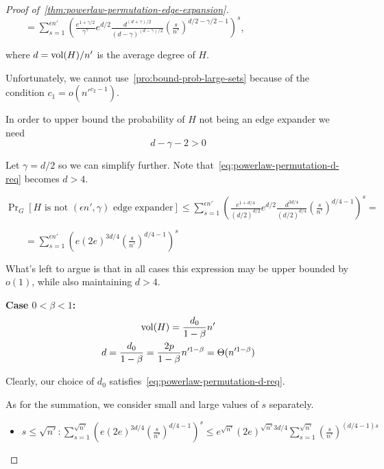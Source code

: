 \begin{proof}[Proof of~\autoref{thm:powerlaw-permutation-edge-expansion}]
    $\qquad=\sum_{s=1}^{\epsilon n'}{\left(
    \frac{e^{1+\gamma/2}}{\gamma^\gamma}
    e^{d/2}
    \frac{d^{(d+\gamma)/2}}{(d-\gamma)^{(d-\gamma)/2}}
    \left(\frac{s}{n'}\right)^{d/2-\gamma/2-1}
    \right)^s}$,
    
    where $d=\operatorname*{vol}(H)/n'$ is the average degree of $H$.
    
    Unfortunately, we cannot use~\autoref{pro:bound-prob-large-sets}
    because of the condition $c_1=o\left(n'^{c_2-1}\right)$.
    
    In order to upper bound the probability of $H$ not being an edge expander we need
    \begin{equation}
        \label{eq:powerlaw-permutation-d-req}
        d-\gamma-2>0
    \end{equation}
    
    Let $\gamma=d/2$ so we can simplify further.
    Note that~\eqref{eq:powerlaw-permutation-d-req} becomes $d>4$.
    
    $\Pr_G[H\text{ is not }(\epsilon n',\gamma)\text{ edge expander}]\leq\sum_{s=1}^{\epsilon n'}{\left(
        \frac{e^{1+d/4}}{(d/2)^{d/2}}
        e^{d/2}
        \frac{d^{3d/4}}{(d/2)^{d/4}}
        \left(\frac{s}{n'}\right)^{d/4-1}
    \right)^s}=$
    
    $\qquad=\sum_{s=1}^{\epsilon n'}{\left(
        e
        (2e)^{3d/4}
        \left(\frac{s}{n'}\right)^{d/4-1}
    \right)^s}$

    What's left to argue is that in all cases this expression may be upper bounded by $o(1)$, while also maintaining $d>4$.
    
    \textbf{Case $0<\beta<1$:}
    \begin{gather*}
        \operatorname*{vol}(H)=\frac{d_0}{1-\beta}n'\\
        d=\frac{d_0}{1-\beta}=\frac{2p}{1-\beta}n'^{1-\beta}=\Theta(n'^{1-\beta})
    \end{gather*}
    
    Clearly, our choice of $d_0$ satisfies~\eqref{eq:powerlaw-permutation-d-req}.

    As for the summation, we consider small and large values of $s$ separately.
    \begin{itemize}
        \item $s\leq\sqrt{n'}:
        \sum_{s=1}^{\sqrt{n'}}{\left(
            e
            (2e)^{3d/4}
            \left(\frac{s}{n'}\right)^{d/4-1}
        \right)^s}
        \leq e^{\sqrt{n'}}(2e)^{\sqrt{n'}3d/4}\sum_{s=1}^{\sqrt{n'}}{
            \left(\frac{s}{n'}\right)^{(d/4-1)s}
        }$
    

\end{itemize}
\end{proof}
